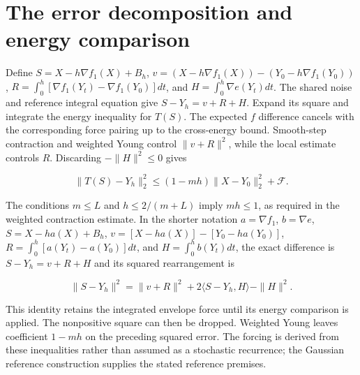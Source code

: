 \documentclass[11pt,a4paper]{article}
\begin{document}
\section{\texorpdfstring{The error decomposition and energy comparison}{The error decomposition and energy comparison}}


Define \(S=X-h\nabla f_1(X)+B_h\), \(v=(X-h\nabla f_1(X))-(Y_0-h\nabla f_1(Y_0))\), \(R=\int_0^h[\nabla f_1(Y_t)-\nabla f_1(Y_0)]dt\), and \(H=\int_0^h\nabla e(Y_t)dt\). The shared noise and reference integral equation give \(S-Y_h=v+R+H\). Expand its square and integrate the energy inequality for \(T(S)\). The expected \(f\) difference cancels with the corresponding force pairing up to the cross-energy bound. Smooth-step contraction and weighted Young control \(\|v+R\|^2\), while the local estimate controls \(R\). Discarding \(-\|H\|^2\le0\) gives

\[\|T(S)-Y_h\|_2^2\le(1-mh)\|X-Y_0\|_2^2+\mathcal F.\]

The conditions \(m\le L\) and \(h\le2/(m+L)\) imply \(mh\le1\), as required in the weighted contraction estimate. In the shorter notation \(a=\nabla f_1\), \(b=\nabla e\), \(S=X-ha(X)+B_h\), \(v=[X-ha(X)]-[Y_0-ha(Y_0)]\), \(R=\int_0^h[a(Y_t)-a(Y_0)]dt\), and \(H=\int_0^h b(Y_t)dt\), the exact difference is \(S-Y_h=v+R+H\) and its squared rearrangement is

\[\|S-Y_h\|^2=\|v+R\|^2+2\langle S-Y_h,H\rangle-\|H\|^2.\]

This identity retains the integrated envelope force until its energy comparison is applied. The nonpositive square can then be dropped. Weighted Young leaves coefficient \(1-mh\) on the preceding squared error. The forcing is derived from these inequalities rather than assumed as a stochastic recurrence; the Gaussian reference construction supplies the stated reference premises.
\end{document}
